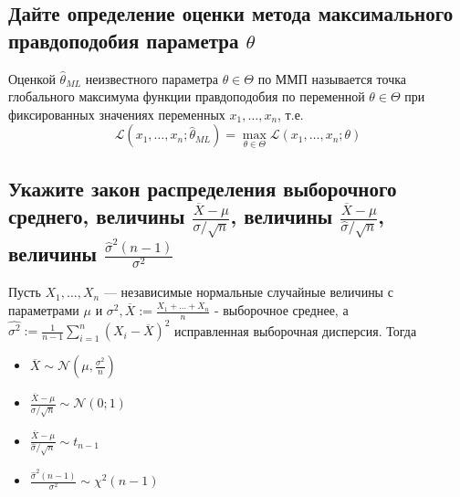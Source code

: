 \documentclass{article}
\begin{document}
\subsection{Дайте определение оценки метода максимального правдоподобия параметра $\theta$}
 Оценкой $\hat{\theta}_{ML}$ неизвестного параметра $\theta \in \Theta$ по ММП называется точка глобального максимума функции правдоподобия по переменной $\theta \in \Theta$ при фиксированных значениях переменных $x_{1}, \ldots, x_{n}$, т.е.
\begin{equation*}
    \mathcal{L}\left(x_{1}, \ldots, x_{n} ; \hat{\theta}_{ML}\right)=\max _{\theta \in \Theta} \mathcal{L}\left(x_{1}, \ldots, x_{n} ; \theta\right)
\end{equation*}

\subsection{Укажите закон распределения выборочного среднего, величины $\frac{\overline{X}-\mu}{\sigma / \sqrt{n}}$, величины $\frac{\overline{X}-\mu}{\hat{\sigma} / \sqrt{n}}$, величины $\frac{\hat{\sigma}^{2}(n-1)}{\sigma^{2}}$}
Пусть $X_{1}, \ldots, X_{n}$ — независимые нормальные случайные величины с параметрами $\mu$ и $\sigma^{2}, \overline{X}:=\frac{X_{1}+\ldots+X_{n}}{n}$ - выборочное среднее, а $\widehat{\sigma^{2}}:=\frac{1}{n-1} \sum_{i=1}^{n}\left(X_{i}-\overline{X}\right)^{2}$ исправленная выборочная дисперсия. Тогда
\begin{itemize}
    \item $\overline{X} \sim \mathcal{N}\left(\mu, \frac{\sigma^2}{n} \right)$
    \item $\frac{\overline{X}-\mu}{\sigma / \sqrt{n}}\sim\mathcal{N}(0;1)$
    \item $\frac{\overline{X}-\mu}{\hat{\sigma} / \sqrt{n}}\sim t_{n-1}$
    \item $\frac{\hat{\sigma}^{2}(n-1)}{\sigma^{2}} \sim \chi^{2}(n-1)$
\end{itemize}
\end{document}
